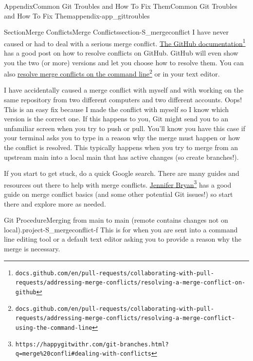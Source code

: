 \documentclass[oneside,10pt,]{book}
\begin{document}
\begin{appendixptx}{Appendix}{Common Git Troubles and How To Fix Them}{}{Common Git Troubles and How To Fix Them}{}{}{appendix-app_gittroubles}
\begin{sectionptx}{Section}{Merge Conflicts}{}{Merge Conflicts}{}{}{section-S_mergeconflict}
I have never caused or had to deal with a serious merge conflict. \href{https://docs.github.com/en/pull-requests/collaborating-with-pull-requests/addressing-merge-conflicts/resolving-a-merge-conflict-on-github}{The GitHub documentation}\footnote{\nolinkurl{docs.github.com/en/pull-requests/collaborating-with-pull-requests/addressing-merge-conflicts/resolving-a-merge-conflict-on-github}\label{fn-S_mergeconflict-c-b}} has a good post on how to resolve conflicts on GitHub. GitHub will even show you the two (or more) versions and let you choose how to resolve them. You can also \href{https://docs.github.com/en/pull-requests/collaborating-with-pull-requests/addressing-merge-conflicts/resolving-a-merge-conflict-using-the-command-line}{resolve merge conflicts on the command line}\footnote{\nolinkurl{docs.github.com/en/pull-requests/collaborating-with-pull-requests/addressing-merge-conflicts/resolving-a-merge-conflict-using-the-command-line}\label{fn-S_mergeconflict-c-d}} or in your text editor.%
\par
I have accidentally caused a merge conflict with myself and with working on the same repository from two different computers and two different accounts. Oops! This is an easy fix because I made the conflict with myself so I know which version is the correct one. If this happens to you, Git might send you to an unfamiliar screen when you try to push or pull. You'll know you have this case if your terminal asks you to type in a reason why the merge must happen or how the conflict is resolved. This typically happens when you try to merge from an upstream main into a local main that has active changes (so create branches!).%
\par
If you start to get stuck, do a quick Google search. There are many guides and resources out there to help with merge conflicts. \href{https://happygitwithr.com/git-branches.html?q=merge\%20confli\#dealing-with-conflicts}{Jennifer Bryan}\footnote{\nolinkurl{https://happygitwithr.com/git-branches.html?q=merge\%20confli\#dealing-with-conflicts}\label{fn-S_mergeconflict-e-b}} has a good guide on merge conflict basics (and some other potential Git issues!) so start there and explore more as needed.%
\begin{project}{Git Procedure}{Merging from main to main (remote contains changes not on local).}{project-S_mergeconflict-f}%
This is for when you are sent into a command line editing tool or a default text editor asking you to provide a reason why the merge is necessary.%
\begin{enumerate}[font=\bfseries,label=(\alph*),ref=\alph*]%

\end{enumerate}
\end{project}
\end{sectionptx}
\end{appendixptx}
\end{document}
